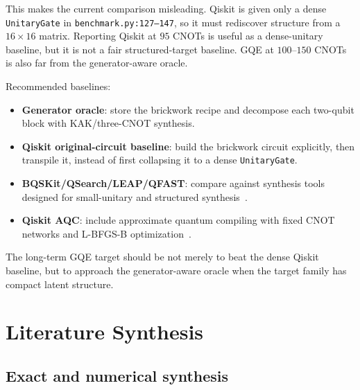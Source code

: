 \documentclass[11pt]{article}
\begin{document}
This makes the current comparison misleading.  Qiskit is given only a dense
\texttt{UnitaryGate} in \texttt{benchmark.py:127--147}, so it must rediscover
structure from a \(16 \times 16\) matrix.  Reporting Qiskit at \(95\) CNOTs is
useful as a dense-unitary baseline, but it is not a fair structured-target
baseline.  GQE at \(100\)--\(150\) CNOTs is also far from the generator-aware
oracle.

Recommended baselines:
\begin{itemize}
  \item \textbf{Generator oracle}: store the brickwork recipe and decompose each
  two-qubit block with KAK/three-CNOT synthesis.
  \item \textbf{Qiskit original-circuit baseline}: build the brickwork circuit
  explicitly, then transpile it, instead of first collapsing it to a dense
  \texttt{UnitaryGate}.
  \item \textbf{BQSKit/QSearch/LEAP/QFAST}: compare against synthesis tools
  designed for small-unitary and structured synthesis~\cite{bqskitdocs,qfast,leap}.
  \item \textbf{Qiskit AQC}: include approximate quantum compiling with fixed
  CNOT networks and L-BFGS-B optimization~\cite{madden2021aqc,qiskitaqc}.
\end{itemize}

The long-term GQE target should be not merely to beat the dense Qiskit baseline,
but to approach the generator-aware oracle when the target family has compact
latent structure.

\section{Literature Synthesis}

\subsection{Exact and numerical synthesis}
\end{document}
